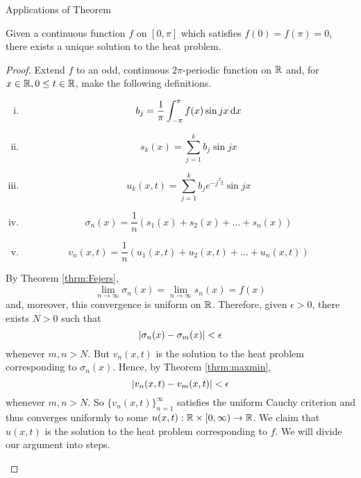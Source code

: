 \begin{section}{Applications of \fejers Theorem}

\begin{thrm}
	Given a continuous function $f$ on $[0,\pi]$ which
	satisfies $f(0)=f(\pi)=0$, there exists a unique
	solution to the heat problem.
\end{thrm}

\begin{proof}
	Extend $f$ to an odd, continuous $2\pi$-periodic function
	on $\real$ and, for $\isreal, 0 \leq t \in \real$, make
	the following definitions.
		\begin{enumerate}[i)]
			\item
				\begin{displaymath}
					b_j = \frac{1}{\pi}\myintb[\pi]
						{f(x)\sin jx}{x}
				\end{displaymath}
			\item
				\begin{displaymath}
					s_k(x) = \sum_{j=1}^k b_j \sin jx
				\end{displaymath}
			\item
				\begin{displaymath}
					u_k(x,t) = \sum_{j=1}^k b_j e^{-j^2t}
						\sin jx
				\end{displaymath}
			\item
				\begin{displaymath}
					\sigma_n(x) = \frac{1}{n}(s_1(x)+s_2(x)+\ldots
						+s_n(x))
				\end{displaymath}
			\item
				\begin{displaymath}
					v_n(x,t) = \frac{1}{n}(u_1(x,t)+u_2(x,t)+\ldots
						+u_n(x,t))
				\end{displaymath}
		\end{enumerate}
	By Theorem \ref{thrm:Fejers},
		\begin{displaymath}
			\lim_{n \rightarrow \infty} \sigma_n(x)
				= \lim_{n \rightarrow \infty} s_n(x) = f(x)
		\end{displaymath}
	and, moreover, this convergence is uniform on $\real$.
	Therefore, given $\epsilon > 0$, there exists $N > 0$
	such that
		\begin{displaymath}
			\modulus{\sigma_n(x)-\sigma_m(x)} < \epsilon
		\end{displaymath}
	whenever $m,n > N$. But $v_n(x,t)$ is the solution to
	the heat problem corresponding to $\sigma_n(x)$. Hence,
	by Theorem \ref{thrm:maxmin},
		\begin{displaymath}
			\modulus{v_n(x,t)-v_m(x,t)} < \epsilon
		\end{displaymath}
	whenever $m,n > N$. So $\{v_n(x,t)\}_{n=1}^\infty$
	satisfies the uniform Cauchy criterion and thus 
	converges uniformly to some $u(x,t):\real \times [0,\infty)
	\rightarrow \real$. We claim that $u(x,t)$ is the solution
	to the heat problem corresponding to $f$. We will divide
	our argument into steps.
		\begin{enumerate}[{Step} 1.]
		

\end{enumerate}
\end{proof}
\end{section}
